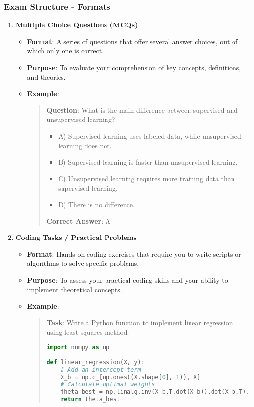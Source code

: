 \documentclass[aspectratio=169]{beamer}
\begin{document}
\begin{frame}[fragile]
    \frametitle{Exam Structure - Formats}
    \begin{enumerate}
        \item \textbf{Multiple Choice Questions (MCQs)}
            \begin{itemize}
                \item \textbf{Format}: A series of questions that offer several answer choices, out of which only one is correct.
                \item \textbf{Purpose}: To evaluate your comprehension of key concepts, definitions, and theories.
                \item \textbf{Example}:
                \begin{quote}
                    \textbf{Question}: What is the main difference between supervised and unsupervised learning?
                    \begin{itemize}
                        \item A) Supervised learning uses labeled data, while unsupervised learning does not.
                        \item B) Supervised learning is faster than unsupervised learning.
                        \item C) Unsupervised learning requires more training data than supervised learning.
                        \item D) There is no difference.
                    \end{itemize}
                    \textbf{Correct Answer}: A
                \end{quote}
            \end{itemize}

        \item \textbf{Coding Tasks / Practical Problems}
            \begin{itemize}
                \item \textbf{Format}: Hands-on coding exercises that require you to write scripts or algorithms to solve specific problems.
                \item \textbf{Purpose}: To assess your practical coding skills and your ability to implement theoretical concepts.
                \item \textbf{Example}:
                \begin{quote}
                    \textbf{Task}: Write a Python function to implement linear regression using least squares method.
                    \begin{lstlisting}[language=Python]
import numpy as np

def linear_regression(X, y):
    # Add an intercept term
    X_b = np.c_[np.ones((X.shape[0], 1)), X]
    # Calculate optimal weights
    theta_best = np.linalg.inv(X_b.T.dot(X_b)).dot(X_b.T).dot(y)
    return theta_best
                    \end{lstlisting}
                \end{quote}
            \end{itemize}
    \end{enumerate}
\end{frame}
\end{document}

